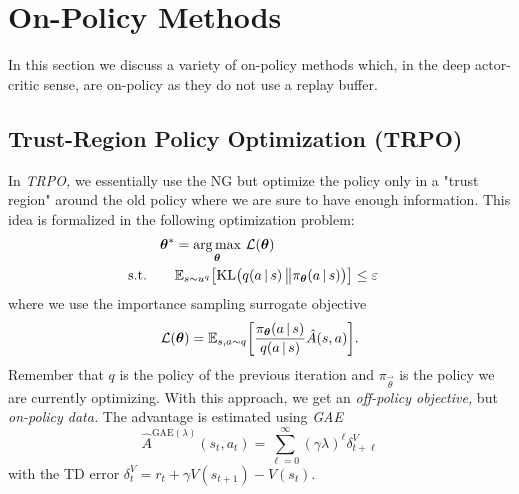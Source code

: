 	\section{On-Policy Methods}
		In this section we discuss a variety of on-policy methods which, in the deep actor-critic sense, are on-policy as they do not use a replay buffer.

		\subsection{Trust-Region Policy Optimization (\acs{TRPO})}
			In \emph{\ac{TRPO},} we essentially use the \ac{NG} but optimize the policy only in a "trust region" around the old policy where we are sure to have enough information. This idea is formalized in the following optimization problem:
			\begin{equation}
				\begin{aligned}
					\bm{\theta}^\ast &= \operatorname*{arg\,max}_{\bm{\theta}} \, \mathcal{L}(\bm{\theta}) \\
					\text{s.t.}\qquad&
						\begin{aligned}
							\mathbb{E}_{s \sim u^q}\bigl[ \operatorname{KL}\bigl( q(a \,\vert\, s) \,\big\Vert \pi_{\bm{\theta}}(a \,\vert\, s) \bigr) \bigr] &\leq \varepsilon
						\end{aligned}
				\end{aligned}
			\end{equation}
			where we use the importance sampling surrogate objective
			\begin{equation}
				\mathcal{L}(\bm{\theta}) = \mathbb{E}_{s, a \sim q}\biggl[ \frac{\pi_{\bm{\theta}}(a \,\vert\, s)}{q(a \,\vert\, s)} \hat{A}(s, a) \biggr].
			\end{equation}
			Remember that \(q\) is the policy of the previous iteration and \(\pi_{\vec{\theta}}\) is the policy we are currently optimizing. With this approach, we get an \emph{off-policy objective,} but \emph{on-policy data.} The advantage is estimated using \emph{\ac{GAE}}
			\begin{equation}
				\hat{A}^{\mathrm{GAE}(\lambda)}(s_t, a_t) = \sum_{\ell = 0}^{\infty} (\gamma \lambda)^\ell \delta_{t + \ell}^V
			\end{equation}
			with the \ac{TD} error \( \delta_t^V = r_t + \gamma V(s_{t + 1}) - V(s_t) \).

